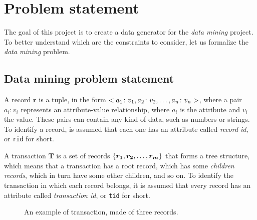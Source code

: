 \documentclass{acm_proc_article-sp-sigmod09}
\begin{document}
\section{Problem statement}
The goal of this project is to create a data generator for the \emph{data mining} project. To better understand which are the constraints to consider, let us formalize the \emph{data mining} problem.

\subsection{Data mining problem statement}
A record $\boldsymbol{r}$ is a tuple, in the form $<a_1 \colon v_1, a_2 \colon v_2, \text{\dots}, a_n \colon v_n>$, where a pair $a_i \colon v_i$ represents an attribute-value relationship, where $a_i$ is the attribute and $v_i$ the value. These pairs can contain any kind of data, such as numbers or strings. To identify a record, is assumed that each one has an attribute called \emph{record id}, or \texttt{rid} for short.

A transaction $\boldsymbol{T}$ is a set of records $\{\boldsymbol{r_1}, \boldsymbol{r_2}, \text{\dots}, \boldsymbol{r_m}\}$ that forms a tree structure, which means that a transaction has a root record, which has some \emph{children records}, which in turn have some other children, and so on. To identify the transaction in which each record belongs, it is assumed that every record has an attribute called \emph{transaction id}, or \texttt{tid} for short.

\begin{figure}
\centering
{}
\caption{An example of transaction, made of three records.}
\label{fig:transaction}
\end{figure}
\end{document}
